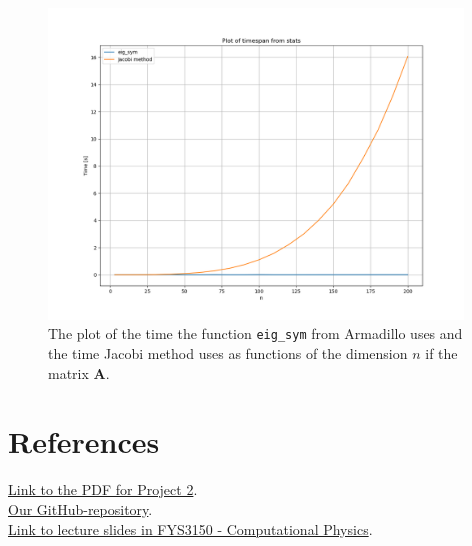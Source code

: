 \documentclass{article}
\begin{document}
\begin{figure}[ht]
	\centering
	\includegraphics[width = 11cm]{timespan-stats.png}
	\caption{The plot of the time the function \texttt{eig\_sym} from Armadillo uses and the time Jacobi method uses as functions of the dimension $n$ if the matrix \textbf{A}. }
  \label{fig:timespanpng}
\end{figure}



\clearpage

\vspace{1cm}

\section{References} \label{sec:References}


\href{https://github.com/CompPhysics/ComputationalPhysics/blob/master/doc/Projects/2019/Project2/pdf/Project2.pdf}{Link to the PDF for Project 2}. \\

\href{https://github.com/Erikbgram/Fys3150}{Our GitHub-repository}. \\

\href{https://github.com/CompPhysics/ComputationalPhysics/blob/master/doc/Lectures/lectures2015.pdf}{Link to lecture slides in FYS3150 - Computational Physics}.









\end{document}
